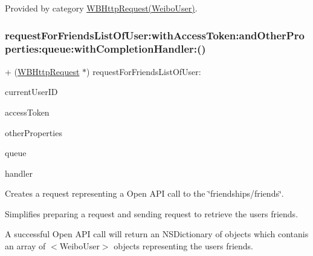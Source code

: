 Provided by category \mbox{\hyperlink{category_w_b_http_request_07_weibo_user_08_a6e438b749b6311301808d7ae0923d7c3}{W\+B\+Http\+Request(\+Weibo\+User)}}.

\mbox{\label{interface_w_b_http_request_a6bec26ae942e00b30352846353c10f4d}} 
\subsubsection{\texorpdfstring{request\+For\+Friends\+List\+Of\+User\+:with\+Access\+Token\+:and\+Other\+Properties\+:queue\+:with\+Completion\+Handler\+:()}{requestForFriendsListOfUser:withAccessToken:andOtherProperties:queue:withCompletionHandler:()}\hspace{0.1cm}{\footnotesize\ttfamily [1/3]}}
{\footnotesize\ttfamily + (\mbox{\hyperlink{interface_w_b_http_request}{W\+B\+Http\+Request}} $\ast$) request\+For\+Friends\+List\+Of\+User\+: \begin{DoxyParamCaption}\item[{(N\+S\+String $\ast$)}]{current\+User\+ID }\item[{withAccessToken:(N\+S\+String $\ast$)}]{access\+Token }\item[{andOtherProperties:(N\+S\+Dictionary $\ast$)}]{other\+Properties }\item[{queue:(N\+S\+Operation\+Queue $\ast$)}]{queue }\item[{withCompletionHandler:(W\+B\+Request\+Handler)}]{handler }\end{DoxyParamCaption}}

Creates a request representing a Open A\+PI call to the \char`\"{}friendships/friends\char`\"{}.

Simplifies preparing a request and sending request to retrieve the user\textquotesingle{}s friends.

A successful Open A\+PI call will return an N\+S\+Dictionary of objects which contanis an array of $<$\+Weibo\+User$>$ objects representing the user\textquotesingle{}s friends.

